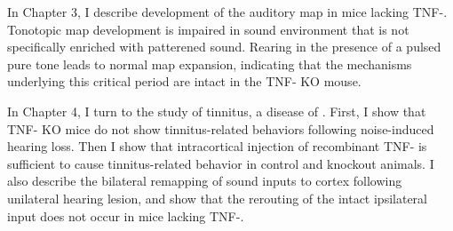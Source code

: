 In Chapter 3, I describe development of the auditory map in mice lacking TNF-\textalpha{}. Tonotopic map development is impaired in sound environment that is not specifically enriched with patterened sound. Rearing in the presence of a pulsed pure tone leads to normal map expansion, indicating that the mechanisms underlying this critical period are intact in the TNF-\textalpha{} KO mouse.

In Chapter 4, I turn to the study of tinnitus, a disease of . First, I show that TNF-\textalpha{} KO mice do not show tinnitus-related behaviors following noise-induced hearing loss. Then I show that intracortical injection of recombinant TNF-\textalpha{} is sufficient to cause tinnitus-related behavior in control and knockout animals. I also describe the bilateral remapping of sound inputs to cortex following unilateral hearing lesion, and show that the rerouting of the intact ipsilateral input does not occur in mice lacking TNF-\textalpha{}.